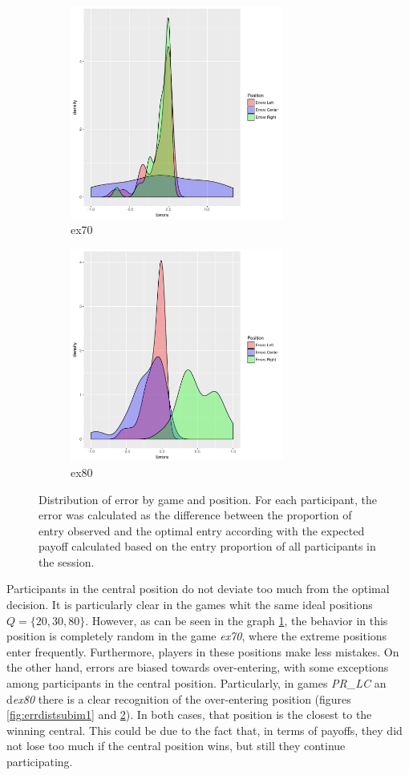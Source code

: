 \begin{figure}[h]
	\begin{subfigure}{0.5\textwidth}
	\includegraphics[width=1\linewidth, height=7cm]{../../results/figures/errorDistributionex70} 
	\caption{ex70}
	\label{fig:errdistsubim5}
	\end{subfigure}
	\begin{subfigure}{0.5\textwidth}
	\includegraphics[width=1\linewidth, height=7cm]{../../results/figures/errorDistributionex80}
	\caption{ex80}
	\label{fig:errdistsubim6}
	\end{subfigure}
	
	\caption{Distribution of error by game and position. For each participant, the error was calculated as the difference between the proportion of entry observed and the optimal entry according with the expected payoff calculated based on the entry proportion of all participants in the session.}
	\label{fig:errordist}
\end{figure}


Participants in the central position do not deviate too much from the optimal decision. It is particularly clear in the games whit the same ideal positions $Q=\{20, 30, 80\}$. However, as can be seen in the graph \ref{fig:errdistsubim5}, the behavior in this position is completely random in the game \emph{ex70}, where the extreme positions enter frequently. Furthermore, players in these positions make less mistakes. On the other hand, errors are biased towards over-entering, with some exceptions among participants in the central position. Particularly, in games \emph{PR\_LC} an d\emph{ex80} there is a clear recognition of the over-entering position (figures \ref{fig:errdistsubim1} and \ref{fig:errdistsubim6}). In both cases, that position is the closest to the winning central. This could be due to the fact that, in terms of payoffs, they did not lose too much if the central position wins, but still they continue participating. 



